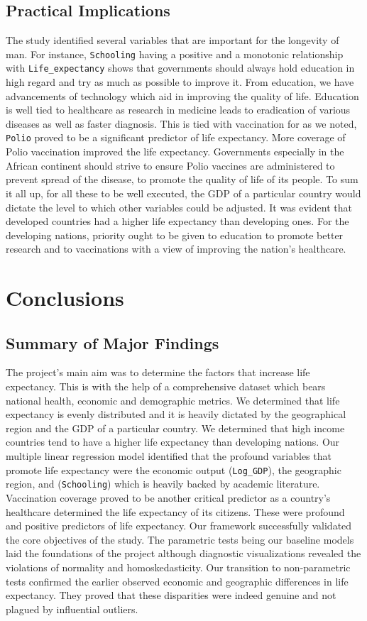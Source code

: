 \documentclass[3pt, a4paper]{article}
\begin{document}
\subsection{Practical Implications}
The study identified several variables that are important for the longevity of man. For instance, \texttt{Schooling} having a positive and a monotonic relationship with \texttt{Life\_expectancy} shows that governments should always hold education in high regard and try as much as possible to improve it. From education, we have advancements of technology which aid in improving the quality of life. Education is well tied to healthcare as research in medicine leads to eradication of various diseases as well as faster diagnosis. This is tied with vaccination for as we noted, \texttt{Polio} proved to be a significant predictor of life expectancy. More coverage of Polio vaccination improved the life expectancy. Governments especially in the African continent should strive to ensure Polio vaccines are administered to prevent spread of the disease, to promote the quality of life of its people. To sum it all up, for all these to be well executed, the GDP of a particular country would dictate the level to which other variables could be adjusted. It was evident that developed countries had a higher life expectancy than developing ones. For the developing nations, priority ought to be given to education to promote better research and to vaccinations with a view of improving the nation's healthcare.

\section{Conclusions}

\subsection{Summary of Major Findings}
The project's main aim was to determine the factors that increase life expectancy. This is with the help of a comprehensive dataset which bears national health, economic and demographic metrics. We determined that life expectancy is evenly distributed and it is heavily dictated by the geographical region and the GDP of a particular country.  We determined that high income countries tend to have a higher life expectancy than developing nations. Our multiple linear regression model identified that the profound variables that promote life expectancy were the economic output (\texttt{Log\_GDP}), the geographic region, and (\texttt{Schooling}) which is heavily backed by academic literature. Vaccination coverage proved to be another critical predictor as a country's healthcare determined the life expectancy of its citizens. These were profound and positive predictors of life expectancy.
Our framework successfully validated the core objectives of the study. The parametric tests being our baseline models laid the foundations of the project although diagnostic visualizations revealed the violations of normality and homoskedasticity. Our transition to non-parametric tests confirmed the earlier observed economic and geographic differences in life expectancy. They proved that these disparities were indeed genuine and not plagued by influential outliers.
\end{document}
